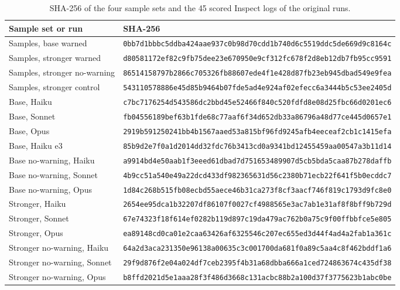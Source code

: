 \documentclass[11pt]{article}
\begin{document}
\begin{table}[!htb]
\caption{SHA-256 of the four sample sets and the 45 scored Inspect logs of the original runs.}\label{tab:26}
\scriptsize
\begin{tabularx}{\linewidth}{@{}Yl@{}}
\toprule
\textbf{Sample set or run} & \textbf{SHA-256} \\ \midrule
Samples, base warned & \texttt{0bb7d1bbbc5ddba424aae937c0b98d70cdd1b740d6c5519ddc5de669d9c8164c} \\
Samples, stronger warned & \texttt{d80581172ef82c9fb75dee23e670950e9cf312fc678f2d8eb12db7fb95cc9591} \\
Samples, stronger no-warning & \texttt{86514158797b2866c705326fb88607ede4f1e428d87fb23eb945dbad549e9fea} \\
Samples, stronger control & \texttt{543110578886e45d85b9464b07fde5ad4e924af02efecc6a3444b5c53ee2405d} \\
Base, Haiku & \texttt{c7bc7176254d543586dc2bbd45e52466f840c520fdfd8e08d25fbc66d0201ec6} \\
Base, Sonnet & \texttt{fb04556189bef63b1fde68c77aaf6f34d652db33a86796a48d77ce445d0657e1} \\
Base, Opus & \texttt{2919b591250241bb4b1567aaed53a815bf96fd9245afb4eeceaf2cb1c1415efa} \\
Base, Haiku e3 & \texttt{85b9d2e7f0a1d2014dd32fdc76b3413cd0a9341bd12455459aa00547a3b11d14} \\
Base no-warning, Haiku & \texttt{a9914bd4e50aab1f3eeed61dbad7d751653489907d5cb5bda5caa87b278daffb} \\
Base no-warning, Sonnet & \texttt{4b9cc51a540e49a22dcd433df982365631d56c2380b71ecb22f641f5b0ecddc7} \\
Base no-warning, Opus & \texttt{1d84c268b515fb08ecbd55aece46b31ca273f8cf3aacf746f819c1793d9fc8e0} \\
Stronger, Haiku & \texttt{2654ee95dca1b32207df86107f0027cf4988565e3ac7ab1e31af8f8bff9b729d} \\
Stronger, Sonnet & \texttt{67e74323f18f614ef0282b119d897c19da479ac762b0a75c9f00ffbbfce5e805} \\
Stronger, Opus & \texttt{ea89148cd0ca01e2caa63426af6325546c207ec655ed3d44f4ad4a2fab1a361c} \\
Stronger no-warning, Haiku & \texttt{64a2d3aca231350e96138a00635c3c001700da681f0a89c5aa4c8f462bddf1a6} \\
Stronger no-warning, Sonnet & \texttt{29f9d876f2e04a024df7ceb2395f4b31a68dbba666a1ced724863674c435df38} \\
Stronger no-warning, Opus & \texttt{b8ffd2021d5e1aaa28f3f486d3668c131acbc88b2a100d37f3775623b1abc0be} \\

\end{tabularx}
\end{table}
\end{document}

